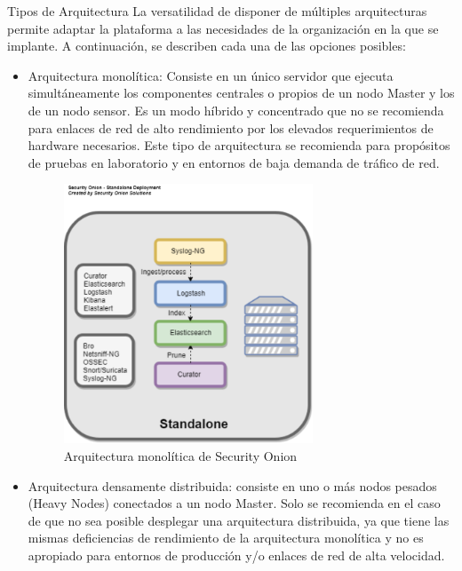     \begin{subsubsection}{Tipos de Arquitectura}
    \label{tipos_de_arquitectura}
      La versatilidad de disponer de múltiples arquitecturas permite adaptar la plataforma a las necesidades de la organización en la que se implante. A continuación, se describen cada una de las opciones posibles:
    \begin{itemize}
         \item Arquitectura monolítica: Consiste en un único servidor que ejecuta simultáneamente los componentes centrales o propios de un nodo Master y los de un nodo sensor. Es un modo híbrido y concentrado que no se recomienda para enlaces de red de alto rendimiento por los elevados requerimientos de hardware necesarios. 
         Este tipo de arquitectura se recomienda para propósitos de pruebas en laboratorio y en entornos de baja demanda de tráfico de red.
        \begin{figure}[H]
            \centering
            \includegraphics[width=0.7\textwidth]{./descripcion_sonion_imagenes/figura_17_arq_monolitica_sonion.png}
            \caption{Arquitectura monolítica de Security Onion\cite{sonion}}
            \label{fig:arq_monolitica_sonion}
        \end{figure}
        \FloatBarrier
        \pagebreak
        \item Arquitectura densamente distribuida: consiste en uno o más nodos pesados (Heavy Nodes) conectados a un nodo Master. Solo se recomienda en el caso de que no sea posible desplegar una arquitectura distribuida, ya que tiene las mismas deficiencias de rendimiento de la arquitectura monolítica y no es apropiado para entornos de producción y/o enlaces de red de alta velocidad.

\end{itemize}
\end{subsubsection}
